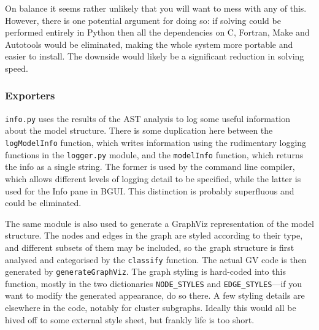 \documentclass[a4paper,11pt]{article}
\begin{document}
On balance it seems rather unlikely that you will want to mess with any of this. However, there is one potential argument for doing so: if solving could be performed entirely in Python then all the dependencies on C, Fortran, Make and Autotools would be eliminated, making the whole system more portable and easier to install. The downside would likely be a significant reduction in solving speed.

\subsubsection{Exporters}

\texttt{info.py} uses the results of the AST analysis to log some useful information about the model structure. There is some duplication here between the \texttt{logModelInfo} function, which writes information using the rudimentary logging functions in the \texttt{logger.py} module, and the \texttt{modelInfo} function, which returns the info as a single string. The former is used by the command line compiler, which allows different levels of logging detail to be specified, while the latter is used for the Info pane in BGUI. This distinction is probably superfluous and could be eliminated.

The same module is also used to generate a GraphViz representation of the model structure. The nodes and edges in the graph are styled according to their type, and different subsets of them may be included, so the graph structure is first analysed and categorised by the \texttt{classify} function. The actual GV code is then generated by \texttt{generateGraphViz}. The graph styling is hard-coded into this function, mostly in the two dictionaries \texttt{NODE\_STYLES} and \texttt{EDGE\_STYLES}---if you want to modify the generated appearance, do so there. A few styling details are elsewhere in the code, notably for cluster subgraphs. Ideally this would all be hived off to some external style sheet, but frankly life is too short.
\end{document}
